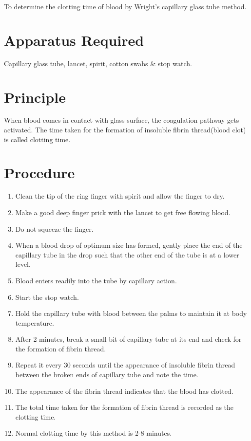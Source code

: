 \documentclass[a4paper,12pt,openany,twoside]{book}
\begin{document}
											To determine the clotting time of blood by Wright’s capillary glass tube method.
											\section*{Apparatus Required}
											Capillary glass tube, lancet, spirit, cotton swabs \& stop watch.
											\section*{Principle}
											When blood comes in contact with glass surface, the coagulation pathway gets activated.
											The time taken for the formation of insoluble fibrin thread(blood clot) is called clotting time.
											\section*{Procedure}
											\begin{enumerate}
												\item{Clean the tip of the ring finger with spirit and allow the finger to dry.}
												\item{Make a good deep finger prick with the lancet to get free flowing blood.}
												\item{Do not squeeze the finger.}
												\item{When a blood drop of optimum size has formed, gently place the end of the capillary tube in the drop such that the other end of the tube is at a lower level.}
												\item{Blood enters readily into the tube by capillary action.}
												\item{Start the stop watch.}
												\item{Hold the capillary tube with blood between the palms to maintain it at body temperature.}
												\item{After 2 minutes, break a small bit of capillary tube at its end and check for the formation of fibrin thread.}
												\item{Repeat it every 30 seconds until the appearance of insoluble fibrin thread between the broken ends of capillary tube and note the time.}
												\item{The appearance of the fibrin thread indicates that the blood has clotted.}
												\item{The total time taken for the formation of fibrin thread is recorded as the clotting time.}
												\item{Normal clotting time by this method is 2-8 minutes.}
											\end{enumerate}
\end{document}
